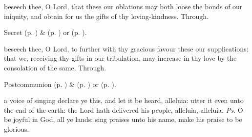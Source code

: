 
\secret
{} beseech thee, O Lord, that these our oblations may both loose the bonds of our iniquity, and obtain for us the gifts of thy loving-kindness. Through.
\begin{rubric}
     Secret  (p. \pageref{SPMaryInEaster}) \&   (p. \pageref{SPAgainst}) or  (p. \pageref{SPChiefBishop}).
\end{rubric}


\postcommunion
{} beseech thee, O Lord, to further with thy gracious favour these our supplications: that we, receiving thy gifts in our tribulation, may increase in thy love by the consolation of the same. Through.
\begin{rubric}
     Postcommunion  (p. \pageref{SPMaryInEaster}) \&   (p. \pageref{SPAgainst}) or  (p. \pageref{SPChiefBishop}).
\end{rubric}
\clearpage
{}

\introit

\vspace{-0.05\baselineskip}

 a voice of singing declare ye this, and let it be heard, alleluia: utter it even unto the end of the earth: the Lord hath delivered his people, alleluia, alleluia. \textit{Ps.} O be joyful in God, all ye lands: sing praises unto his name, make his praise to be glorious.

